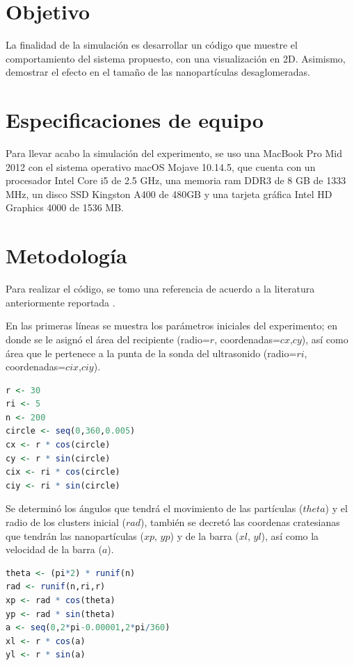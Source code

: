 \documentclass[12pt, letterpaper] {article}
\begin{document}
\section{Objetivo}

La finalidad de la simulación es desarrollar un código que muestre el comportamiento del sistema propuesto, con una visualización en 2D. Asimismo, demostrar el efecto en el tamaño de las nanopartículas desaglomeradas. 

\section{Especificaciones de equipo}
 
Para llevar acabo la simulación del experimento, se uso una MacBook Pro Mid 2012 con el sistema operativo macOS Mojave 10.14.5, que cuenta con un procesador Intel Core i5 de 2.5 GHz, una memoria ram DDR3 de 8 GB de 1333 MHz, un disco SSD Kingston A400 de 480GB y una tarjeta gráfica Intel HD Graphics 4000 de 1536 MB.
 
 
\section{Metodología}
 
Para realizar el código, se tomo una referencia de acuerdo a la literatura anteriormente reportada \cite{elisawebIEP} \cite{MP9}. 

En las primeras líneas se muestra los parámetros iniciales del experimento; en donde se le asignó el área del recipiente (radio=$r$, coordenadas=$cx$,$cy$), así como área que le pertenece a la punta de la sonda del ultrasonido (radio=$ri$, coordenadas=$cix$,$ciy$).

\begin{lstlisting}[language=R]
r <- 30
ri <- 5
n <- 200 
circle <- seq(0,360,0.005)
cx <- r * cos(circle)
cy <- r * sin(circle)
cix <- ri * cos(circle)
ciy <- ri * sin(circle)
\end{lstlisting}

Se determinó los ángulos que tendrá el movimiento de las partículas ($theta$) y el radio de los clusters inicial ($rad$), también se decretó las coordenas cratesianas que tendrán las nanopartículas ($xp$, $yp$) y de la barra ($xl$, $yl$), así como la velocidad de la barra ($a$).
 
\begin{lstlisting}[language=R]
theta <- (pi*2) * runif(n)
rad <- runif(n,ri,r)
xp <- rad * cos(theta)
yp <- rad * sin(theta)
a <- seq(0,2*pi-0.00001,2*pi/360)
xl <- r * cos(a) 
yl <- r * sin(a) 
\end{lstlisting}
\end{document}
